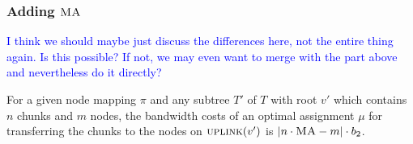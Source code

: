 \documentclass[9pt,twocolumn]{scrartcl}
\newcommand{\stefan}[1]{\textcolor{blue}{#1}}
\newcommand{\MaFactor}{\ensuremath{\textsc{MA}}}
\newcommand{\VmChunkAssignment}{\mu}
\newcommand{\NodeMapping}{\pi}
\newcommand{\SubstrateNode}{\ensuremath{v}}
\newcommand{\Uplink}{\ensuremath{\textsc{uplink}}}
\newcommand{\MA}{\textsc{MA}}
\newcommand{\Tree}{\ensuremath{T}}
\newcommand{\CostTrans}{\ensuremath{b_2}}
\begin{document}
\subsubsection{Adding $\MA$}

\stefan{I think we should maybe just discuss the differences here, not the entire thing again. Is this possible?
If not, we may even want to merge with the part above and nevertheless do it directly?}

\begin{lemma}
\label{lemma:adding-ma}
For a given node mapping $\NodeMapping$ and any subtree $\Tree'$
of $\Tree$ with root $\SubstrateNode'$ which contains $n$ chunks and $m$
nodes, the bandwidth costs of an optimal assignment $\VmChunkAssignment$ for
transferring the chunks to the nodes 
on $\Uplink(\SubstrateNode')$ is $|n\cdot\MaFactor
- m| \cdot \CostTrans$.
\end{lemma}
\end{document}
